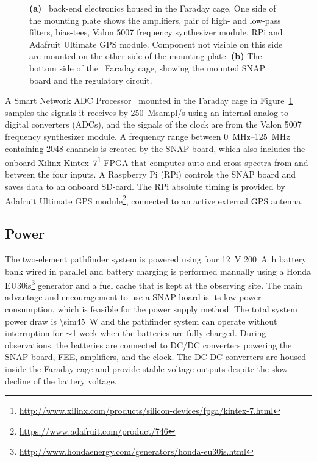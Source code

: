 \begin{figure}
\begin{subfigure}[t]{0.47\textwidth}
		\caption{} \label{Fig:47093128324_04792aa5c5_o}
	\end{subfigure}
	\caption{{\bf (a)} \albatros\ back-end electronics housed in the Faraday cage. One side of the mounting plate shows the amplifiers, pair of high- and low-pass filters, bias-tees, Valon 5007 frequency synthesizer module, RPi and Adafruit Ultimate GPS module. Component not visible on this side are mounted on the other side of the mounting plate. {\bf (b)} The bottom side of the \albatros\ Faraday cage, showing the mounted SNAP board and the regulatory circuit.} \label{Fig:faraday1}
\end{figure}

A Smart Network ADC Processor~\citep[SNAP;][]{2016JAI.....541001H} mounted in the Faraday cage in Figure~\ref{Fig:47093128324_04792aa5c5_o} samples the signals it receives by \SI{250}{Msampl/s} using an internal analog to digital converters (ADCs), and the signals of the clock are from the Valon 5007 frequency synthesizer module. A frequency range between \SIrange{0}{125}{\mega\hertz} containing 2048 channels is created by the SNAP board, which also includes the onboard Xilinx Kintex~7\footnote{\url{http://www.xilinx.com/products/silicon-devices/fpga/kintex-7.html}} FPGA that computes auto and cross spectra from and between the four inputs. A Raspberry Pi (RPi) controls the SNAP board and saves data to an onboard SD-card. The RPi absolute timing is provided by Adafruit Ultimate GPS module\footnote{\url{https://www.adafruit.com/product/746}}, connected
to an active external GPS antenna.

\subsection{Power}
The two-element pathfinder system is powered using four \SI{12}{\volt} \SI{200}{\ampere\hour} battery bank wired in parallel and battery charging is performed manually using a Honda EU30is\footnote {\url{http://www.hondaenergy.com/generators/honda-eu30is.html}} generator and a fuel cache that is kept at the observing site. The main advantage and encouragement to use a SNAP board is its low power consumption, which is feasible for the power supply method. The total system power draw is \SI{\sim45}{\watt} and the pathfinder system can operate without interruption for $\sim$1 week when the batteries are fully charged. During observations, the batteries are connected to DC/DC converters powering the SNAP board, FEE, amplifiers, and the clock. The DC-DC converters are housed inside the Faraday cage and provide stable voltage outputs	despite the slow decline of the battery voltage.

